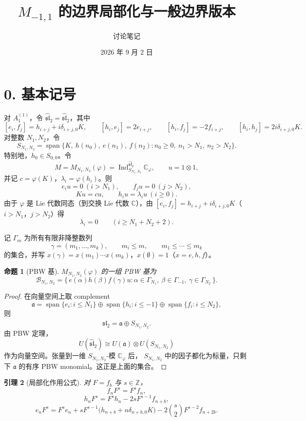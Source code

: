 \documentclass[UTF8,11pt]{ctexart}
\title{\(M_{-1,1}\) 的边界局部化与一般边界版本}
\author{讨论笔记}
\date{2026 年 9 月 2 日}
\newcommand{\C}{\mathbb C}
\newcommand{\Z}{\mathbb Z}
\newcommand{\G}{\Gamma}
\newcommand{\slh}{\widehat{\mathfrak{sl}}_2}
\newcommand{\Ind}{\operatorname{Ind}}
\theoremstyle{plain}
\newtheorem{proposition}{命题}
\newtheorem{lemma}[proposition]{引理}
\theoremstyle{definition}
\begin{document}
\maketitle

\section*{0. 基本记号}

对 \(A_1^{(1)}\)，令 \(\slh=\widehat{\mathfrak{sl}}_2\)，其中
\[
  [e_i,f_j]=h_{i+j}+i\delta_{i+j,0}K,\qquad
  [h_i,e_j]=2e_{i+j},\qquad
  [h_i,f_j]=-2f_{i+j},\qquad
  [h_i,h_j]=2i\delta_{i+j,0}K.
\]
对整数 \(N_1,N_2\)，令
\[
  S_{N_1,N_2}
  =
  \operatorname{span}\{K,\ h(n_0),\ e(n_1),\ f(n_2):
  n_0\ge0,\ n_1>N_1,\ n_2>N_2\}.
\]
特别地，\(h_0\in S_{0,0}\)。令
\[
  M=M_{N_1,N_2}(\varphi)=\Ind_{S_{N_1,N_2}}^{\slh}\C_\varphi,
  \qquad
  u=1\otimes1,
\]
并记 \(c=\varphi(K)\)，\(\lambda_i=\varphi(h_i)\)。则
\[
  e_iu=0\ (i>N_1),\qquad f_ju=0\ (j>N_2),
\]
\[
  Ku=cu,\qquad h_iu=\lambda_iu\ (i\ge0).
\]
由于 \(\varphi\) 是 Lie 代数同态（到交换 Lie 代数 \(\C\)），由
\([e_i,f_j]=h_{i+j}+i\delta_{i+j,0}K\)（\(i>N_1\)，\(j>N_2\)）得
\[
  \lambda_i=0\qquad(i\ge N_1+N_2+2).
\]

记 \(\G_m\) 为所有有限非降整数列
\[
  \gamma=(m_1,\ldots,m_k),\qquad m_i\le m,\qquad m_1\le\cdots\le m_k
\]
的集合，并写 \(x(\gamma)=x(m_1)\cdots x(m_k)\)，\(x(\emptyset)=1\)（\(x=e,h,f\)）。

\begin{proposition}[PBW 基]\label{prop:pbw}
\(M_{N_1,N_2}(\varphi)\) 的一组 PBW 基为
\[
  \mathcal B_{N_1,N_2}
  =
  \{\,
    e(\alpha)h(\beta)f(\gamma)u:
    \alpha\in\G_{N_1},\ \beta\in\G_{-1},\ \gamma\in\G_{N_2}
  \,\}.
\]
\end{proposition}

\begin{proof}
在向量空间上取 complement
\[
  \mathfrak a
  =
  \operatorname{span}\{e_i:i\le N_1\}
  \oplus
  \operatorname{span}\{h_i:i\le -1\}
  \oplus
  \operatorname{span}\{f_i:i\le N_2\},
\]
则
\[
  \slh=\mathfrak a\oplus S_{N_1,N_2}.
\]
由 PBW 定理，
\[
  U(\slh)\cong U(\mathfrak a)\otimes U(S_{N_1,N_2})
\]
作为向量空间。张量到一维 \(S_{N_1,N_2}\)-模 \(\C_\varphi\) 后，
\(S_{N_1,N_2}\) 中的因子都化为标量，只剩下 \(\mathfrak a\) 的有序 PBW
monomial。这正是上面的集合。
\end{proof}

\begin{lemma}[局部化作用公式]\label{lem:loc}
对 \(F=f_b\) 与 \(s\in\Z\)，
\[
  f_nF^s=F^sf_n,
\]
\[
  h_nF^s=F^sh_n-2sF^{s-1}f_{n+b},
\]
\[
  e_nF^s
  =
  F^se_n
  +sF^{s-1}\bigl(h_{n+b}+n\delta_{n+b,0}K\bigr)
  -2\binom{s}{2}F^{s-2}f_{n+2b}.
\]
\end{lemma}
\end{document}

